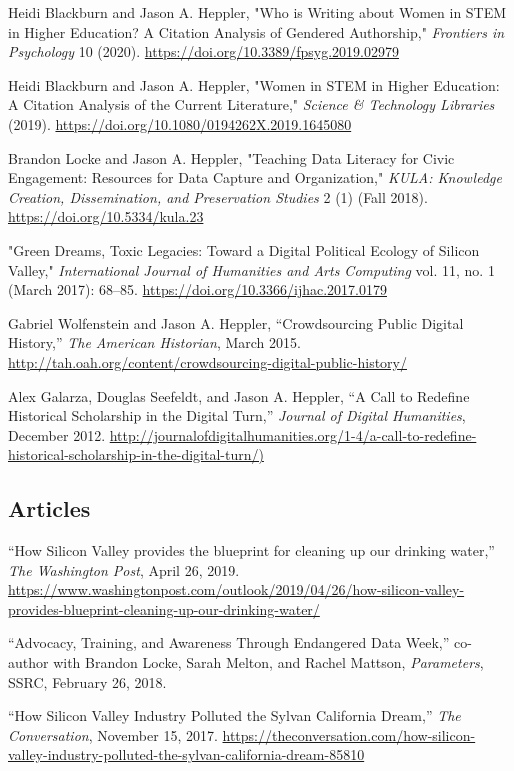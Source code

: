 \documentclass[10pt]{article}
\begin{document}
Heidi Blackburn and Jason A. Heppler, "Who is Writing about Women in STEM in Higher Education? A Citation Analysis of Gendered Authorship," \textit{Frontiers in Psychology} 10 (2020). \url{https://doi.org/10.3389/fpsyg.2019.02979}

Heidi Blackburn and Jason A. Heppler, "Women in STEM in Higher Education: A Citation Analysis of the Current Literature," \textit{Science \& Technology Libraries} (2019). \url{https://doi.org/10.1080/0194262X.2019.1645080}

Brandon Locke and Jason A. Heppler, "Teaching Data Literacy for Civic Engagement: Resources for Data Capture and Organization," \textit{KULA: Knowledge Creation, Dissemination, and Preservation Studies} 2 (1) (Fall 2018). \url{https://doi.org/10.5334/kula.23}

"Green Dreams, Toxic Legacies: Toward a Digital Political Ecology of Silicon Valley," \textit{International Journal of Humanities and Arts Computing} vol. 11, no. 1 (March 2017): 68--85. \url{https://doi.org/10.3366/ijhac.2017.0179}

Gabriel Wolfenstein and Jason A. Heppler, ``Crowdsourcing Public Digital History,'' \textit{The American Historian}, March 2015. \url{http://tah.oah.org/content/crowdsourcing-digital-public-history/}

Alex Galarza, Douglas Seefeldt, and Jason A. Heppler, ``A Call to Redefine Historical Scholarship in the Digital Turn,'' \textit{Journal of Digital Humanities}, December 2012. \url{http://journalofdigitalhumanities.org/1-4/a-call-to-redefine-historical-scholarship-in-the-digital-turn/)}

\subsection{Articles}\label{articles}

``How Silicon Valley provides the blueprint for cleaning up our drinking water,'' \textit{The Washington Post}, April 26, 2019. \url{https://www.washingtonpost.com/outlook/2019/04/26/how-silicon-valley-provides-blueprint-cleaning-up-our-drinking-water/}

``Advocacy, Training, and Awareness Through Endangered Data Week,'' co-author with Brandon Locke, Sarah Melton, and Rachel Mattson, \textit{Parameters}, SSRC, February 26, 2018.

``How Silicon Valley Industry Polluted the Sylvan California Dream,'' \textit{The Conversation}, November 15, 2017. \url{https://theconversation.com/how-silicon-valley-industry-polluted-the-sylvan-california-dream-85810}
\end{document}

